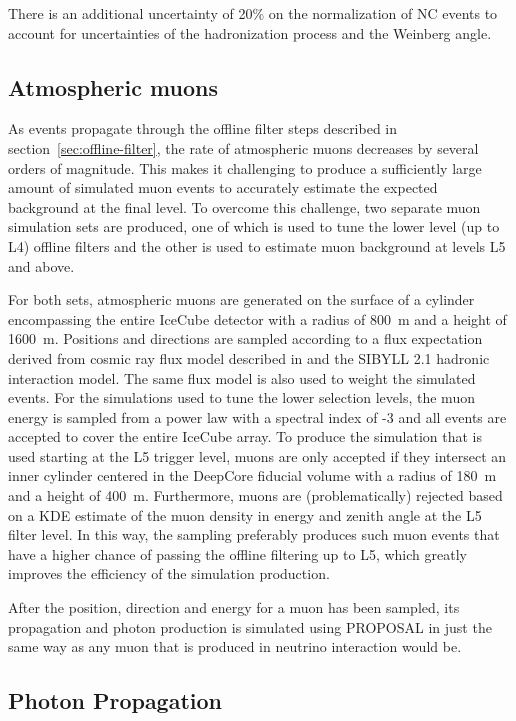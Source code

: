 There is an additional uncertainty of 20\% on the normalization of NC events to account for uncertainties of the hadronization process and the Weinberg angle.

\subsection{Atmospheric muons}
As events propagate through the offline filter steps described in section~\ref{sec:offline-filter}, the rate of atmospheric muons decreases by several orders of magnitude. This makes it challenging to produce a sufficiently large amount of simulated muon events to accurately estimate the expected background at the final level. To overcome this challenge, two separate muon simulation sets are produced, one of which is used to tune the lower level (up to L4) offline filters and the other is used to estimate muon background at levels L5 and above. 

For both sets, atmospheric muons are generated on the surface of a cylinder encompassing the entire IceCube detector with a radius of 800~m and a height of 1600~m. Positions and directions are sampled according to a flux expectation derived from cosmic ray flux model described in  and the \textsc{SIBYLL 2.1} hadronic interaction model. The same flux model is also used to weight the simulated events. For the simulations used to tune the lower selection levels, the muon energy is sampled from a power law with a spectral index of -3 and all events are accepted to cover the entire IceCube array. To produce the simulation that is used starting at the L5 trigger level, muons are only accepted if they intersect an inner cylinder centered in the DeepCore fiducial volume with a radius of 180~m and a height of 400~m. Furthermore, muons are (problematically) rejected based on a KDE estimate of the muon density in energy and zenith angle at the L5 filter level. In this way, the sampling preferably produces such muon events that have a higher chance of passing the offline filtering up to L5, which greatly improves the efficiency of the simulation production.

After the position, direction and energy for a muon has been sampled, its propagation and photon production is simulated using \textsc{PROPOSAL} in just the same way as any muon that is produced in neutrino interaction would be.


\subsection{Photon Propagation}
\label{sec:photon-propagation}

